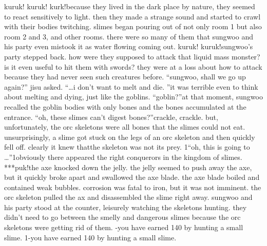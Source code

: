 kuruk! kuruk! kurk!because they lived in the dark place by nature, they seemed to react sensitively to light.
 then they made a strange sound and started to crawl with their bodies twitching.
 slimes began pouring out of not only room 1 but also room 2 and 3, and other rooms.
 there were so many of them that sungwoo and his party even mistook it as water flowing coming out.
kuruk! kuruk!sungwoo’s party stepped back.
 how were they supposed to attack that liquid mass monster? is it even useful to hit them with swords? they were at a loss about how to attack because they had never seen such creatures before.
“sungwoo, shall we go up again?” jisu asked.
“…i don’t want to melt and die.
”it was terrible even to think about melting and dying, just like the goblins.
“goblin?”at that moment, sungwoo recalled the goblin bodies with only bones and the bones accumulated at the entrance.
“oh, these slimes can’t digest bones?”crackle, crackle.
but, unfortunately, the orc skeletons were all bones that the slimes could not eat.
unsurprisingly, a slime got stuck on the legs of an orc skeleton and then quickly fell off.
clearly it knew thatthe skeleton was not its prey.
1“oh, this is going to …”1obviously there appeared the right conquerors in the kingdom of slimes.
***puk!the axe knocked down the jelly.
 the jelly seemed to push away the axe, but it quickly broke apart and swallowed the axe blade.
the axe blade boiled and contained weak bubbles.
 corrosion was fatal to iron, but it was not imminent.
 the orc skeleton pulled the ax and disassembled the slime right away.
sungwoo and his party stood at the counter, leisurely watching the skeletons hunting.
they didn’t need to go between the smelly and dangerous slimes because the orc skeletons were getting rid of them.
-you have earned 140 by hunting a small slime.
1-you have earned 140 by hunting a small slime.


